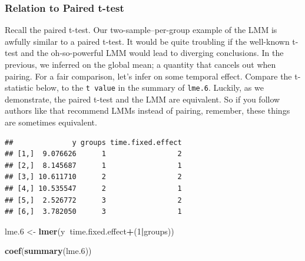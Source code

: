 \documentclass[]{book}
\newenvironment{Shaded}{\begin{snugshade}}{\end{snugshade}}
\newcommand{\DataTypeTok}[1]{\textcolor[rgb]{0.13,0.29,0.53}{#1}}
\newcommand{\DecValTok}[1]{\textcolor[rgb]{0.00,0.00,0.81}{#1}}
\newcommand{\FloatTok}[1]{\textcolor[rgb]{0.00,0.00,0.81}{#1}}
\newcommand{\KeywordTok}[1]{\textcolor[rgb]{0.13,0.29,0.53}{\textbf{#1}}}
\newcommand{\NormalTok}[1]{#1}
\newcommand{\OperatorTok}[1]{\textcolor[rgb]{0.81,0.36,0.00}{\textbf{#1}}}
\newcommand{\StringTok}[1]{\textcolor[rgb]{0.31,0.60,0.02}{#1}}
\theoremstyle{definition}
\theoremstyle{definition}
\theoremstyle{definition}
\theoremstyle{remark}
\begin{document}
\hypertarget{relation-to-paired-t-test}{%
\subsubsection{Relation to Paired t-test}\label{relation-to-paired-t-test}}

Recall the paired t-test.
Our two-sample--per-group example of the LMM is awfully similar to a paired t-test.
It would be quite troubling if the well-known t-test and the oh-so-powerful LMM would lead to diverging conclusions.
In the previous, we inferred on the global mean; a quantity that cancels out when pairing. For a fair comparison, let's infer on some temporal effect.
Compare the t-statistic below, to the \texttt{t\ value} in the summary of \texttt{lme.6}.
Luckily, as we demonstrate, the paired t-test and the LMM are equivalent.
So if you follow authors like \citet{barr2013random} that recommend LMMs instead of pairing, remember, these things are sometimes equivalent.

\begin{Shaded}
\end{Shaded}

\begin{verbatim}
##              y groups time.fixed.effect
## [1,]  9.076626      1                 2
## [2,]  8.145687      1                 1
## [3,] 10.611710      2                 2
## [4,] 10.535547      2                 1
## [5,]  2.526772      3                 2
## [6,]  3.782050      3                 1
\end{verbatim}

\begin{Shaded}
\begin{Highlighting}[]
\NormalTok{lme}\FloatTok{.6}\NormalTok{ <-}\StringTok{ }\KeywordTok{lmer}\NormalTok{(y}\OperatorTok{~}\NormalTok{time.fixed.effect}\OperatorTok{+}\NormalTok{(}\DecValTok{1}\OperatorTok{|}\NormalTok{groups)) }

\KeywordTok{coef}\NormalTok{(}\KeywordTok{summary}\NormalTok{(lme}\FloatTok{.6}\NormalTok{))}
\end{Highlighting}
\end{Shaded}
\end{document}
